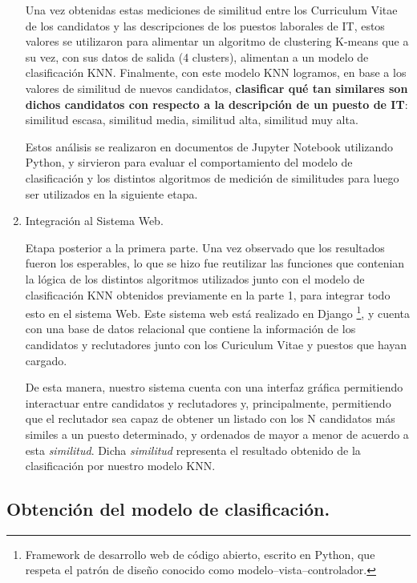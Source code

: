 \documentclass[12pt,a4paper]{article}
\begin{document}
\begin{sloppypar}
\begin{enumerate}
Una vez obtenidas estas mediciones de similitud entre los Curriculum Vitae de los candidatos y las descripciones de los puestos laborales de IT, estos valores se utilizaron para alimentar un algoritmo de clustering K-means que a su vez, con sus datos de salida (4 clusters), alimentan a un modelo de clasificación KNN. Finalmente, con este modelo KNN logramos, en base a los valores de similitud de nuevos candidatos, \textbf{clasificar qué tan similares son dichos candidatos con respecto a la descripción de un puesto de IT}: similitud escasa, similitud media, similitud alta, similitud muy alta.

Estos análisis se realizaron en documentos de Jupyter Notebook utilizando Python, y sirvieron para evaluar el comportamiento del modelo de clasificación y los distintos algoritmos de medición de similitudes para luego ser utilizados en la siguiente etapa. \\

\item Integración al Sistema Web. 

Etapa posterior a la primera parte. Una vez observado que los resultados fueron los esperables, lo que se hizo fue reutilizar las funciones que contenian la lógica de los distintos algoritmos utilizados junto con el modelo de clasificación KNN obtenidos previamente en la parte 1, para integrar todo esto en el sistema Web. Este sistema web está realizado en Django \footnote{Framework de desarrollo web de código abierto, escrito en Python, que respeta el patrón de diseño conocido como modelo–vista–controlador.}, y cuenta con una base de datos relacional que contiene la información de los candidatos y reclutadores junto con los Curiculum Vitae y puestos que hayan cargado. 

De esta manera, nuestro sistema cuenta con una interfaz gráfica permitiendo interactuar entre candidatos y reclutadores y, principalmente, permitiendo que el reclutador sea capaz de obtener un listado con los N candidatos más similes a un puesto determinado, y ordenados de mayor a menor de acuerdo a esta \textit{similitud}. Dicha \textit{similitud} representa el resultado obtenido de la clasificación por nuestro modelo KNN.

\end{enumerate}

\cleardoublepage

\subsection{Obtención del modelo de clasificación.}\label{5.1.Obtenciondelmodelopredictivo}


\end{sloppypar}
\end{document}
